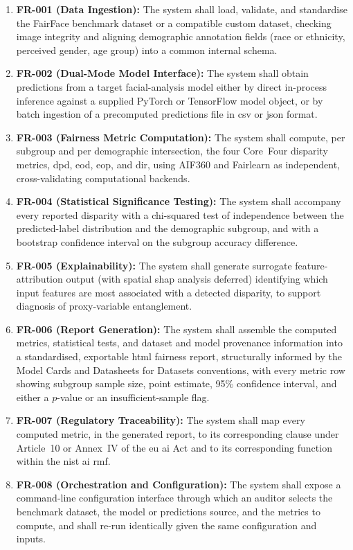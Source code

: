 \begin{enumerate}
    \item \textbf{FR-001 (Data Ingestion):} The system shall load, validate, and standardise the FairFace benchmark dataset or a compatible custom dataset, checking image integrity and aligning demographic annotation fields (race or ethnicity, perceived gender, age group) into a common internal schema.
    \item \textbf{FR-002 (Dual-Mode Model Interface):} The system shall obtain predictions from a target facial-analysis model either by direct in-process inference against a supplied PyTorch or TensorFlow model object, or by batch ingestion of a precomputed predictions file in \gls{csv} or \gls{json} format.
    \item \textbf{FR-003 (Fairness Metric Computation):} The system shall compute, per subgroup and per demographic intersection, the four Core~Four disparity metrics, \gls{dpd}, \gls{eod}, \gls{eop}, and \gls{dir}, using AIF360 and Fairlearn as independent, cross-validating computational backends.
    \item \textbf{FR-004 (Statistical Significance Testing):} The system shall accompany every reported disparity with a chi-squared test of independence between the predicted-label distribution and the demographic subgroup, and with a bootstrap confidence interval on the subgroup accuracy difference.
    \item \textbf{FR-005 (Explainability):} The system shall generate surrogate feature-attribution output (with spatial \gls{shap} analysis deferred) identifying which input features are most associated with a detected disparity, to support diagnosis of proxy-variable entanglement.
    \item \textbf{FR-006 (Report Generation):} The system shall assemble the computed metrics, statistical tests, and dataset and model provenance information into a standardised, exportable \gls{html} fairness report, structurally informed by the Model Cards and Datasheets for Datasets conventions, with every metric row showing subgroup sample size, point estimate, 95\% confidence interval, and either a \(p\)-value or an insufficient-sample flag.
    \item \textbf{FR-007 (Regulatory Traceability):} The system shall map every computed metric, in the generated report, to its corresponding clause under Article~10 or Annex~IV of the \gls{eu} \gls{ai} Act and to its corresponding function within the \gls{nist} \gls{ai} \gls{rmf}.
    \item \textbf{FR-008 (Orchestration and Configuration):} The system shall expose a command-line configuration interface through which an auditor selects the benchmark dataset, the model or predictions source, and the metrics to compute, and shall re-run identically given the same configuration and inputs.

\end{enumerate}
